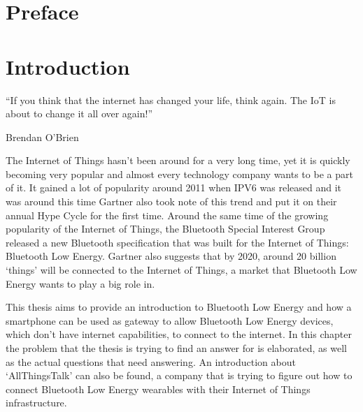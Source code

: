 \documentclass[pdftex,a4paper,12pt,twoside]{report}
\begin{document}
\begin{abstract}
\end{abstract}

\chapter*{Preface}
\label{ch:preface}


\tableofcontents



\chapter{Introduction}
\label{ch:introduction}
\epigraph{``If you think that the internet has changed your life, think again. The IoT is about to change it all over again!''}{Brendan O'Brien}
The Internet of Things hasn't been around for a very long time, yet it is quickly becoming very popular and almost every technology company wants to be a part of it. It gained a lot of popularity around 2011 when IPV6 was released and it was around this time Gartner \citep{gartner2012} also took note of this trend and put it on their annual Hype Cycle for the first time. Around the same time of the growing popularity of the Internet of Things, the Bluetooth Special Interest Group released a new Bluetooth specification that was built for the Internet of Things: Bluetooth Low Energy. Gartner \citep{gartner2015} also suggests that by 2020, around 20 billion `things' will be connected to the Internet of Things, a market that Bluetooth Low Energy wants to play a big role in.

This thesis aims to provide an introduction to Bluetooth Low Energy and how a smartphone can be used as gateway to allow Bluetooth Low Energy devices, which don't have internet capabilities, to connect to the internet. In this chapter the problem that the thesis is trying to find an answer for is elaborated, as well as the actual questions that need answering. An introduction about `AllThingsTalk' can also be found, a company that is trying to figure out how to connect Bluetooth Low Energy wearables with their Internet of Things infrastructure.
\end{document}
